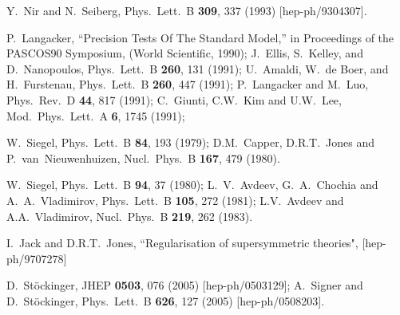 \documentclass[11pt]{article}
\def\perspectives{in {\it Perspectives on Supersymmetry}, ed.
G.L.~Kane (World Scientific, 1998)}
\begin{document}
\begin{thebibliography}{999}
Y.~Nir and N.~Seiberg,
  Phys.\ Lett.\ B {\bf 309}, 337 (1993)
  [hep-ph/9304307].

P.~Langacker, ``Precision Tests Of The Standard Model,''
  in Proceedings of the PASCOS90 Symposium, 
  (World Scientific, 1990);
J.~Ellis, S.~Kelley, and D.~Nanopoulos, 
  Phys.\ Lett.\ B {\bf 260}, 131 (1991);
U.~Amaldi, W.~de Boer, and H.~Furstenau, 
  Phys.\ Lett.\ B {\bf 260}, 447 (1991);
P.~Langacker and M.~Luo,
  Phys.\ Rev.\ D {\bf 44}, 817 (1991);
C.~Giunti, C.W.~Kim and U.W.~Lee, 
  Mod.\ Phys.\ Lett.\ A {\bf 6}, 1745 (1991);

W.~Siegel, 
  Phys.\ Lett.\ B {\bf 84}, 193 (1979);
D.M.~Capper, D.R.T.~Jones and P.~van~Nieuwenhuizen,
  Nucl.\ Phys.\ B {\bf 167}, 479 (1980).

W.~Siegel, 
  Phys.\ Lett.\ B {\bf 94}, 37 (1980);
L.~V.~Avdeev, G.~A.~Chochia and A.~A.~Vladimirov,
  Phys.\ Lett.\ B {\bf 105}, 272 (1981);
L.V.~Avdeev and A.A.~Vladimirov, 
  Nucl.\ Phys.\ B {\bf 219}, 262 (1983).

I.~Jack and D.R.T.~Jones, 
  ``Regularisation of supersymmetric theories", 
  [hep-ph/9707278]

D.~St\"ockinger,
  JHEP {\bf 0503}, 076 (2005)
  [hep-ph/0503129];
A.~Signer and D.~St\"ockinger,
  Phys.\ Lett.\ B {\bf 626}, 127 (2005)
  [hep-ph/0508203].


\end{thebibliography}
\end{document}
